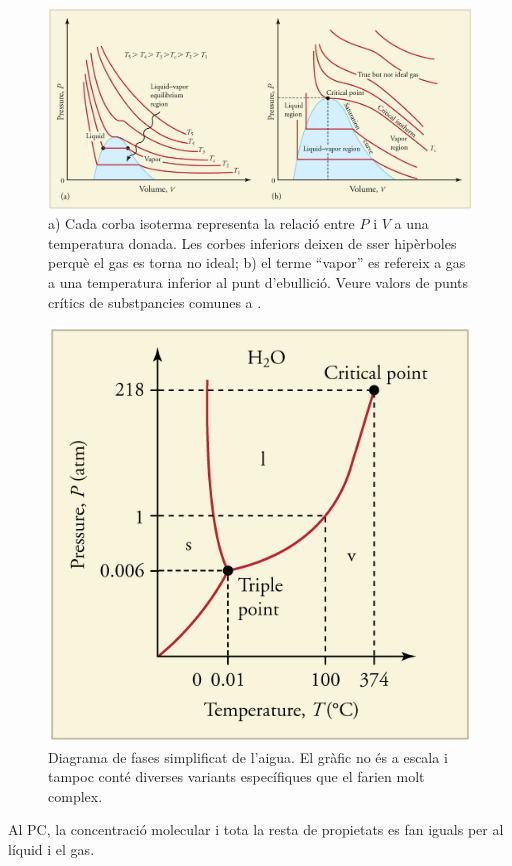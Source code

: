 \begin{figure}[h]
\centering
\includegraphics[scale=0.6]{figures/punt_critic.png}
\caption[Punt crític]{a) Cada corba isoterma representa la relació entre $P$ i $V$ a una temperatura donada. Les corbes inferiors deixen de sser hipèrboles perquè el gas es torna no ideal; b) el terme ``vapor'' es refereix a gas a una temperatura inferior al punt d'ebullició. Veure valors de punts crítics de substpancies comunes a .\cite{openstax_cnx_openstax_nodate}}
\label{fig:punt_critic}
\end{figure}


\begin{figure}[h]
\centering
\includegraphics[scale=0.8]{figures/WaterPD.png}
\caption[Diagrama de fases simplificat de l'aigua]{Diagrama de fases simplificat de l'aigua. El gràfic no és a escala i tampoc conté diverses variants específiques que el farien molt complex.\cite{openstax_cnx_openstax_nodate}}
\label{fig:WaterPD}
\end{figure}
Al PC, la concentració molecular i tota la resta de propietats es fan iguals per al líquid i el gas.

